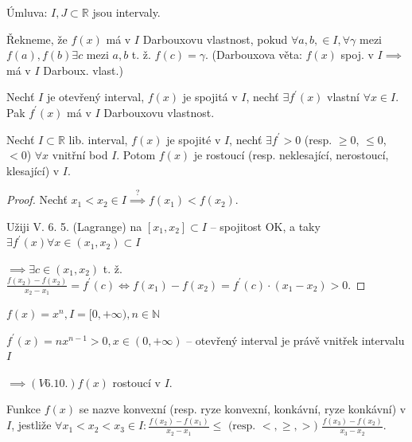 \begin{poznamka}
  Úmluva: $I, J \subset \mathbb R$ jsou intervaly.
\end{poznamka}

\begin{definice}
  Řekneme, že $f(x)$ má v $I$ Darbouxovu vlastnost, pokud $\forall a, b, \in I, \forall \gamma$ mezi $f(a), f(b) \exists c$ mezi $a, b$ t. ž. $f(c) = \gamma$. (Darbouxova věta: $f(x)$ spoj. v $I \implies$ má v $I$ Darboux. vlast.)
\end{definice}

\begin{veta}[*]
  Nechť $I$ je otevřený interval, $f(x)$ je spojitá v $I$, nechť $\exists f^\prime(x)$ vlastní $\forall x \in I$. Pak $f^\prime(x)$ má v $I$ Darbouxovu vlastnost.
\end{veta}

\begin{veta}
  Nechť $I \subset \mathbb R$ lib. interval, $f(x)$ je spojité v $I$, nechť $\exists f^\prime >0$ (resp. $\geq 0$, $\leq 0$, $<0$) $\forall x$ vnitřní bod $I$. Potom $f(x)$ je rostoucí (resp. neklesající, nerostoucí, klesající) v $I$.
\end{veta}
\begin{proof}
  Nechť $x_1 < x_2\in I \stackrel{?}{\implies} f(x_1)<f(x_2)$.

  Užiji V. 6. 5. (Lagrange) na $[x_1, x_2]\subset I$ -- spojitost OK, a taky $\exists f^\prime (x) \forall x \in (x_1, x_2) \subset I$

  $\implies \exists c \in (x_1, x_2)$ t. ž. $\frac{f(x_2)-f(x_2)}{x_2-x_1}={f^\prime(c)} \iff {f(x_1)-f(x_2)} = f^\prime(c)\cdot (x_1-x_2) > 0 $.
\end{proof}

\begin{priklad}
  $f(x) = x^n,I = [0, +\infty), n \in \mathbb N$

  $f^\prime(x)=nx^{n-1} > 0, x \in (0, +\infty)$ -- otevřený interval je právě vnitřek intervalu $I$

  $\implies (V 6. 10.) f(x)$ rostoucí v $I$.
\end{priklad}

\begin{definice}
  Funkce $f(x)$ se nazve konvexní (resp. ryze konvexní, konkávní, ryze konkávní) v $I$, jestliže $\forall x_1 < x_2 < x_3 \in I: \frac{f(x_2)-f(x_1)}{x_2-x_1}\leq \text{ (resp. $<, \geq, >$) } \frac{f(x_3)-f(x_2)}{x_3-x_2}$.
\end{definice}

